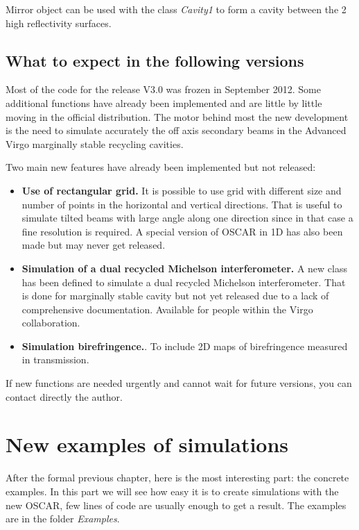 Mirror object can be used with the class \textsl{Cavity1} to form a cavity between the 2 high reflectivity surfaces.


\section{What to expect in the following versions}

Most of the code for the release V3.0 was frozen in September 2012. Some additional functions have already been implemented and are little by little moving in the official distribution. The motor behind most the new development is the need to simulate accurately the off axis secondary beams in the Advanced Virgo marginally stable recycling cavities.

Two main new features have already been implemented but not released:

\begin{itemize}
  \item \textbf{Use of rectangular grid.} It is possible to use grid with different size and number of points in the horizontal and vertical directions. That is useful to simulate tilted beams with large angle along one direction since in that case a fine resolution is required. A special version of OSCAR in 1D has also been made but may never get released.
  \item \textbf{Simulation of a dual recycled Michelson interferometer.} A new class has been defined to simulate a dual recycled Michelson interferometer. That is done for marginally stable cavity but not yet released due to a lack of comprehensive documentation. Available for people within the Virgo collaboration.
   \item \textbf{Simulation birefringence.}. To include 2D maps of birefringence measured in transmission.
\end{itemize}

If new functions are needed urgently and cannot wait for future versions, you can contact directly the author.


\chapter{New examples of simulations}\label{ch4:ex}

After the formal previous chapter, here is the most interesting part: the concrete examples. In this part we will see how easy it is to create simulations with the new OSCAR, few lines of code are usually enough to get a result. The examples are in the folder \textsl{Examples}.

